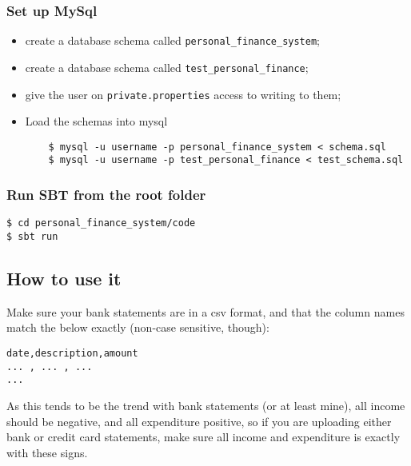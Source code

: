 \subsubsection{Set up MySql}
\begin{itemize}
  \item
    create a database schema called \texttt{personal\_finance\_system};

  \item
    create a database schema called \texttt{test\_personal\_finance};

  \item
    give the user on \texttt{private.properties} access to writing to them;

  \item
    Load the schemas into mysql

    \begin{lstlisting}
    $ mysql -u username -p personal_finance_system < schema.sql
    $ mysql -u username -p test_personal_finance < test_schema.sql
    \end{lstlisting}
\end{itemize}


\subsubsection{Run SBT from the root folder}
\begin{lstlisting}
$ cd personal_finance_system/code
$ sbt run
\end{lstlisting}


\subsection{How to use it}
Make sure your bank statements are in a csv format, and that the column names
match the below exactly (non-case sensitive, though):
\begin{lstlisting}
date,description,amount
... , ... , ...
...
\end{lstlisting}

As this tends to be the trend with bank statements (or at least mine), all
income should be negative, and all expenditure positive, so if you are
uploading either bank or credit card statements, make sure all income and
expenditure is exactly with these signs.
